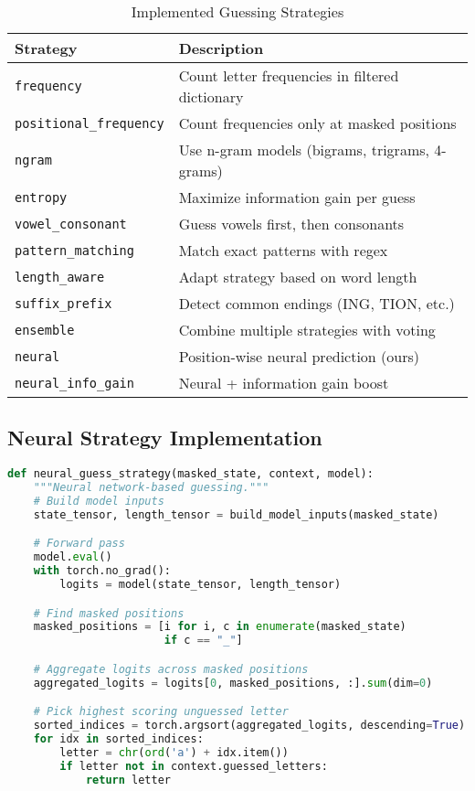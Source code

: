 \documentclass[12pt,a4paper]{article}
\begin{document}
\begin{table}[H]
\centering
\caption{Implemented Guessing Strategies}
\begin{tabular}{@{}lp{8cm}@{}}
\toprule
\textbf{Strategy} & \textbf{Description} \\
\midrule
\texttt{frequency} & Count letter frequencies in filtered dictionary \\
\texttt{positional\_frequency} & Count frequencies only at masked positions \\
\texttt{ngram} & Use n-gram models (bigrams, trigrams, 4-grams) \\
\texttt{entropy} & Maximize information gain per guess \\
\texttt{vowel\_consonant} & Guess vowels first, then consonants \\
\texttt{pattern\_matching} & Match exact patterns with regex \\
\texttt{length\_aware} & Adapt strategy based on word length \\
\texttt{suffix\_prefix} & Detect common endings (ING, TION, etc.) \\
\texttt{ensemble} & Combine multiple strategies with voting \\
\midrule
\texttt{neural} & Position-wise neural prediction (ours) \\
\texttt{neural\_info\_gain} & Neural + information gain boost \\
\bottomrule
\end{tabular}
\end{table}

\subsection{Neural Strategy Implementation}

\begin{lstlisting}[language=Python, caption={Neural Guess Strategy}]
def neural_guess_strategy(masked_state, context, model):
    """Neural network-based guessing."""
    # Build model inputs
    state_tensor, length_tensor = build_model_inputs(masked_state)

    # Forward pass
    model.eval()
    with torch.no_grad():
        logits = model(state_tensor, length_tensor)

    # Find masked positions
    masked_positions = [i for i, c in enumerate(masked_state)
                        if c == "_"]

    # Aggregate logits across masked positions
    aggregated_logits = logits[0, masked_positions, :].sum(dim=0)

    # Pick highest scoring unguessed letter
    sorted_indices = torch.argsort(aggregated_logits, descending=True)
    for idx in sorted_indices:
        letter = chr(ord('a') + idx.item())
        if letter not in context.guessed_letters:
            return letter
\end{lstlisting}
\end{document}
